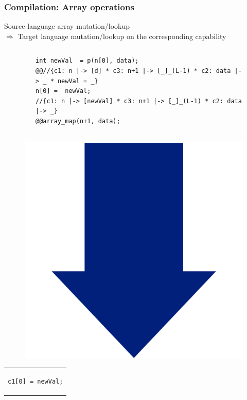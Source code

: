 \documentclass{beamer}
\begin{document}
\begin{frame}[fragile]
\frametitle{Compilation: Array operations}
Source language array mutation/lookup\\
$\Rightarrow$ Target language mutation/lookup on the corresponding capability
 \vspace{-1em}

\begin{columns}
\begin{column}{0.1\textwidth}
\end{column}
\begin{column}{0.90\textwidth}
\begin{figure}[h]
  \centering
\begin{lstlisting}[style=CStyleOverlay, captionpos = t, firstnumber = 13]
int newVal  = p(n[0], data);
@@//{c1: n |-> [d] * c3: n+1 |-> [_]_(L-1) * c2: data |-> _ * newVal = _}
n[0] =  newVal;
//{c1: n |-> [newVal] * c3: n+1 |-> [_]_(L-1) * c2: data |-> _}
@@array_map(n+1, data);
\end{lstlisting}
\end{figure}
\end{column}
\end{columns}

\vspace{-.5em}
\begin{figure}[h]
\includegraphics[width=0.07\linewidth]{BlueArrowVertical}
\end{figure}
\vspace{-2em}

\begin{center}
\begin{tabular}{c}
\begin{lstlisting}[style=CStyleNoNum, captionpos = t]
c1[0] = newVal;
\end{lstlisting}
\end{tabular}
\end{center}

\end{frame}
\end{document}
